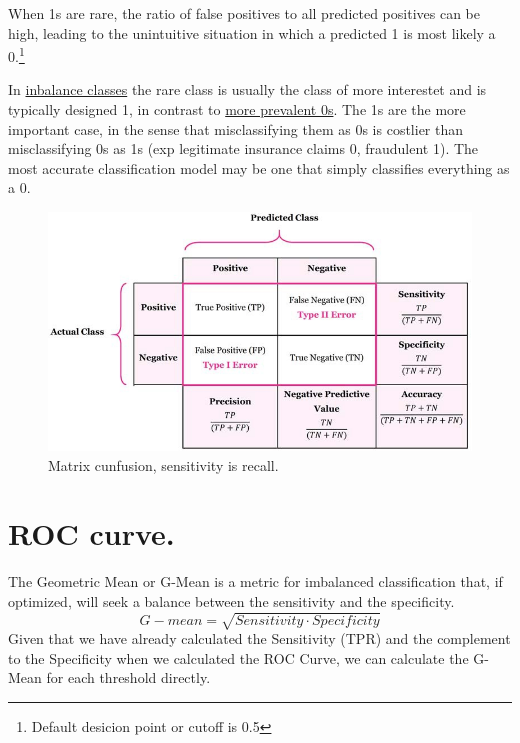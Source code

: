 \documentclass[12pt, a4paper]{book}
\begin{document}
When 1s are rare, the ratio of false positives to all predicted positives can be high, leading to the unintuitive situation in which a predicted 1 is most likely a 0.\footnote{Default desicion point or cutoff is 0.5}

In \underline{inbalance classes} the rare class is usually the class of more interestet and is typically designed 1, in contrast to \underline{more prevalent 0s}. The 1s are the more important case, in the sense that misclassifying them as 0s is costlier than misclassifying 0s as 1s (exp legitimate insurance claims 0, fraudulent 1). The most accurate classification model may be one that simply classifies everything as a 0.
\begin{figure}[H]
	\centering 
	\includegraphics[scale=0.5]{recall.jpg}
	\caption{Matrix cunfusion, sensitivity is recall.}
\end{figure}


\section{ROC curve.}
The Geometric Mean or G-Mean is a metric for imbalanced classification that, if optimized, will seek a balance between the sensitivity and the specificity.
\begin{equation}
	G-mean=\sqrt{Sensitivity \cdot Specificity}
\end{equation}
Given that we have already calculated the Sensitivity (TPR) and the complement to the Specificity when we calculated the ROC Curve, we can calculate the G-Mean for each threshold directly.
\end{document}
